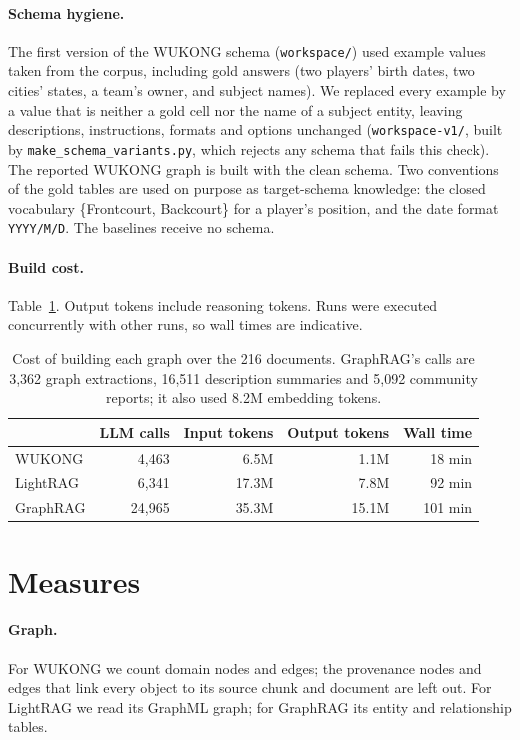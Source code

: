 \documentclass[11pt]{article}
\newcommand{\code}[1]{\texttt{#1}}
\newcommand{\wk}{WUKONG}
\begin{document}
\paragraph{Schema hygiene.} The first version of the \wk{} schema (\code{workspace/}) used
example values taken from the corpus, including gold answers (two players' birth dates, two
cities' states, a team's owner, and subject names). We replaced every example by a value that
is neither a gold cell nor the name of a subject entity, leaving descriptions, instructions,
formats and options unchanged (\code{workspace-v1/}, built by \code{make\_schema\_variants.py},
which rejects any schema that fails this check). The reported \wk{} graph is built with the
clean schema. Two conventions of the gold tables are used on purpose as target-schema knowledge:
the closed vocabulary \{Frontcourt, Backcourt\} for a player's position, and the date format
\code{YYYY/M/D}. The baselines receive no schema.

\paragraph{Build cost.} Table~\ref{tab:cost}. Output tokens include reasoning tokens. Runs were
executed concurrently with other runs, so wall times are indicative.

\begin{table}[h]
\centering
\begin{tabular}{lrrrr}
\toprule
 & LLM calls & Input tokens & Output tokens & Wall time \\
\midrule
\wk{} & 4,463 & 6.5M & 1.1M & 18 min \\
LightRAG & 6,341 & 17.3M & 7.8M & 92 min \\
GraphRAG & 24,965 & 35.3M & 15.1M & 101 min \\
\bottomrule
\end{tabular}
\caption{Cost of building each graph over the 216 documents. GraphRAG's calls are
3,362 graph extractions, 16,511 description summaries and 5,092 community reports; it also used
8.2M embedding tokens.}
\label{tab:cost}
\end{table}

\section{Measures}

\paragraph{Graph.} For \wk{} we count domain nodes and edges; the provenance nodes and edges that
link every object to its source chunk and document are left out. For LightRAG we read its
GraphML graph; for GraphRAG its entity and relationship tables.
\end{document}
